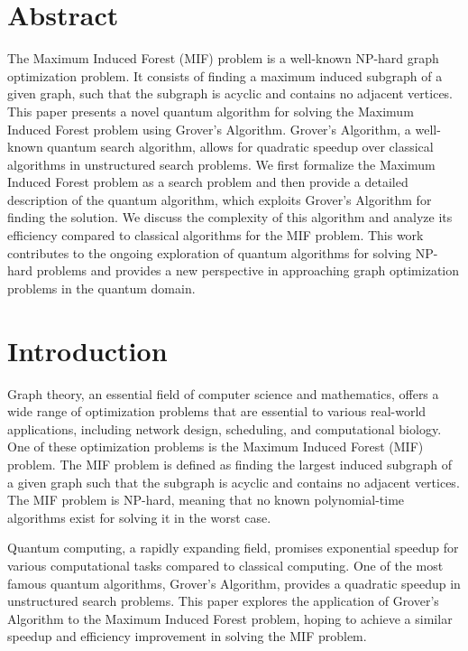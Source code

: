 \section{Abstract}

The Maximum Induced Forest (MIF) problem is a well-known NP-hard graph optimization problem. It consists of finding a maximum induced subgraph of a given graph, such that the subgraph is acyclic and contains no adjacent vertices. This paper presents a novel quantum algorithm for solving the Maximum Induced Forest problem using Grover's Algorithm. Grover's Algorithm, a well-known quantum search algorithm, allows for quadratic speedup over classical algorithms in unstructured search problems. We first formalize the Maximum Induced Forest problem as a search problem and then provide a detailed description of the quantum algorithm, which exploits Grover's Algorithm for finding the solution. We discuss the complexity of this algorithm and analyze its efficiency compared to classical algorithms for the MIF problem. This work contributes to the ongoing exploration of quantum algorithms for solving NP-hard problems and provides a new perspective in approaching graph optimization problems in the quantum domain.

\section{Introduction}

Graph theory, an essential field of computer science and mathematics, offers a wide range of optimization problems that are essential to various real-world applications, including network design, scheduling, and computational biology. One of these optimization problems is the Maximum Induced Forest (MIF) problem. The MIF problem is defined as finding the largest induced subgraph of a given graph such that the subgraph is acyclic and contains no adjacent vertices. The MIF problem is NP-hard, meaning that no known polynomial-time algorithms exist for solving it in the worst case.

Quantum computing, a rapidly expanding field, promises exponential speedup for various computational tasks compared to classical computing. One of the most famous quantum algorithms, Grover's Algorithm, provides a quadratic speedup in unstructured search problems. This paper explores the application of Grover's Algorithm to the Maximum Induced Forest problem, hoping to achieve a similar speedup and efficiency improvement in solving the MIF problem.

